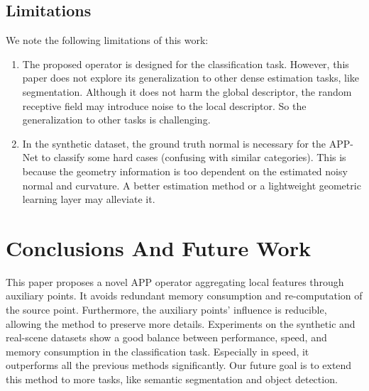 \documentclass[journal]{IEEEtran}
\begin{document}
\subsection{Limitations}

We note the following limitations of this work:

\begin{enumerate}
    \item The proposed operator is designed for the classification task. However, this paper does not explore its generalization to other dense estimation tasks, like segmentation. Although it does not harm the global descriptor,  the random receptive field may introduce noise to the local descriptor. So the generalization to other tasks is challenging.
    \item In the synthetic dataset, the ground truth normal is necessary for the APP-Net to classify some hard cases (confusing with similar categories). This is because the geometry information is too dependent on the estimated noisy normal and curvature. A better estimation method or a lightweight geometric learning layer may alleviate it. 
    
    
\end{enumerate}


\section{Conclusions And Future Work}
This paper proposes a novel APP operator aggregating local features through auxiliary points. It avoids redundant memory consumption and re-computation of the source point. Furthermore, the auxiliary points' influence is reducible, allowing the method to preserve more details. Experiments on the synthetic and real-scene datasets show a good balance between performance, speed, and memory consumption in the classification task. Especially in speed, it outperforms all the previous methods significantly. Our future goal is to extend this method to more tasks, like semantic segmentation and object detection.




\end{document}
